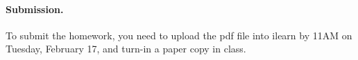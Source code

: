 
\vskip 0.1in
\paragraph{Submission.}
To submit the homework, you need to upload the pdf file into ilearn by 11AM on Tuesday, February 17,
and turn-in a paper copy in class.



\vfill



